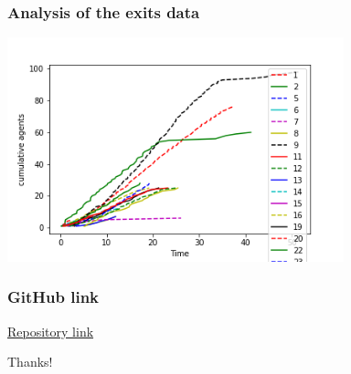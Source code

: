 \documentclass{beamer}
\begin{document}
\begin{frame}
\frametitle{Analysis of the exits data}

\centering
\includegraphics[height=6.5cm]{results_without_lecture_goal_05.png}
\end{frame}

\begin{frame}
\frametitle{GitHub link}
\href{https://github.com/AmrElsayed14/pedestrian_dynamics_jpscore_project.git}{Repository link}

\end{frame}

\begin{frame}
\huge{\centerline{Thanks!}}
\end{frame}
\end{document}
